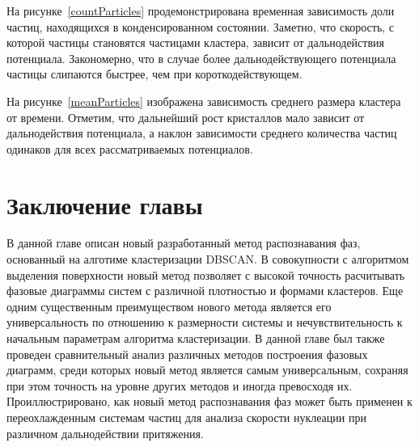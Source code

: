 На рисунке~\ref{countParticles} продемонстрирована временная зависимость доли частиц, находящихся в конденсированном состоянии.
Заметно, что скорость, с которой частицы становятся частицами кластера, зависит от дальнодействия потенциала.
Закономерно, что в случае более дальнодействующего потенциала частицы слипаются быстрее, чем при короткодействующем.


На рисунке~\ref{meanParticles} изображена зависимость среднего размера кластера от времени.
Отметим, что дальнейший рост кристаллов мало зависит от дальнодействия потенциала, а наклон зависимости среднего количества частиц одинаков для всех рассматриваемых потенциалов.


\section{Заключение главы}
\label{PRIMe-SecConclusions}

В данной главе описан новый разработанный метод распознавания фаз, основанный на алготиме кластеризации DBSCAN.
В совокупности с алгоритмом выделения поверхности новый метод позволяет с высокой точность расчитывать фазовые диаграммы систем с различной плотностью и формами кластеров.
Еще одним существенным преимуществом нового метода является его универсальность по отношению к размерности системы и нечувствительность к начальным параметрам алгоритма кластеризации.
В данной главе был также проведен сравнительный анализ различных методов построения фазовых диаграмм, среди которых новый метод является самым универсальным, сохраняя при этом точность на уровне других методов и иногда превосходя их.
Проиллюстрировано, как новый метод распознавания фаз может быть применен к переохлажденным системам частиц для анализа скорости нуклеации при различном дальнодействии притяжения.
